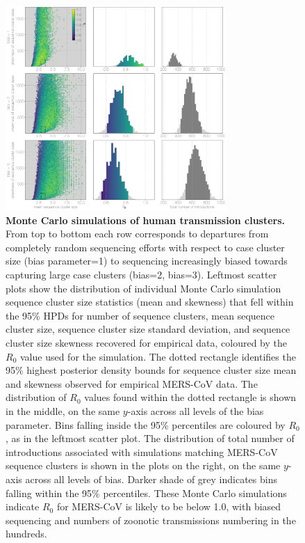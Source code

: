 \documentclass[11pt,oneside,letterpaper]{article}
\begin{document}
\begin{figure}[h]
\centering
	\includegraphics[width=0.75\textwidth]{figures/mers_epi.png}
	\caption{\textbf{Monte Carlo simulations of human transmission clusters.}
From top to bottom each row corresponds to departures from completely random sequencing efforts with respect to case cluster size (bias parameter=1) to sequencing increasingly biased towards capturing large case clusters (bias=2, bias=3).
Leftmost scatter plots show the distribution of individual Monte Carlo simulation sequence cluster size statistics (mean and skewness) that fell within the 95\% HPDs for number of sequence clusters, mean sequence cluster size, sequence cluster size standard deviation, and sequence cluster size skewness recovered for empirical data, coloured by the $R_{0}$ value used for the simulation.
The dotted rectangle identifies the 95\% highest posterior density bounds for sequence cluster size mean and skewness observed for empirical MERS-CoV data.
The distribution of $R_{0}$ values found within the dotted rectangle is shown in the middle, on the same $y$-axis across all levels of the bias parameter.
Bins falling inside the 95\% percentiles are coloured by $R_{0}$, as in the leftmost scatter plot.
The distribution of total number of introductions associated with simulations matching MERS-CoV sequence clusters is shown in the plots on the right, on the same $y$-axis across all levels of bias.
Darker shade of grey indicates bins falling within the 95\% percentiles.
These Monte Carlo simulations indicate $R_{0}$ for MERS-CoV is likely to be below 1.0, with biased sequencing and numbers of zoonotic transmissions numbering in the hundreds.
	}
	\label{mers_epi}
\end{figure}
\end{document}
